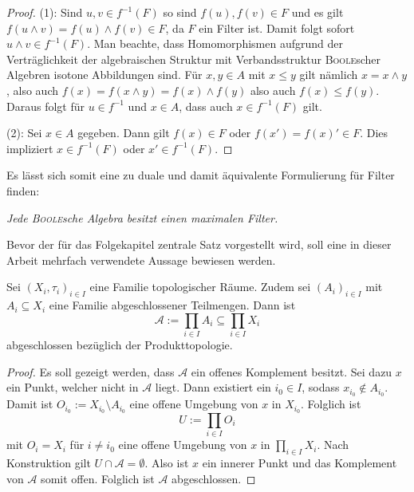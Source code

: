 \begin{proof}
  (1):
  Sind $u,v \in f^{-1}(F)$ so sind $f(u),f(v) \in F$ und es gilt $f(u \land v) = f(u) \land f(v) \in F$, da $F$ ein Filter ist.
  Damit folgt sofort $u \land v \in f^{-1}(F)$.
  Man beachte, dass Homomorphismen aufgrund der Verträglichkeit der algebraischen Struktur mit Verbandsstruktur \textsc{Boole}scher Algebren isotone Abbildungen sind.
  Für $x,y \in A$ mit $x \leq y$ gilt nämlich $x = x \land y$, also auch $f(x) = f(x\land y) = f(x) \land f(y)$ also auch $f(x) \leq f(y)$.
  Daraus folgt für $u \in f^{-1}$ und $x \in A$, dass auch $x \in f^{-1}(F)$ gilt.

  (2):
  Sei $x \in A$ gegeben.
  Dann gilt $f(x) \in F$ oder $f(x') = f(x)' \in F$.
  Dies impliziert $x \in f^{-1}(F)$ oder $x' \in f^{-1}(F)$.
\end{proof}



Es lässt sich somit eine zu \PIT duale und damit äquivalente Formulierung für Filter finden:
  \begin{addmargin}[2em]{2em}%
    \textit{Jede \textsc{Boole}sche Algebra besitzt einen maximalen Filter.}
  \end{addmargin}


Bevor der für das Folgekapitel zentrale Satz vorgestellt wird, soll eine in dieser Arbeit mehrfach verwendete Aussage bewiesen werden.

\begin{prop}
  \label{prop:cartesianclosed}
  Sei $(X_i,\tau_i)_{i \in I}$ eine Familie topologischer Räume. 
  Zudem sei $(A_i)_{i \in I}$ mit  $A_i \subseteq X_i$ eine Familie abgeschlossener Teilmengen.
  Dann ist 
  \begin{displaymath}
    \mathcal{A} := \prod_{i \in I} A_i \subseteq \prod_{i \in I} X_i
  \end{displaymath}
  abgeschlossen bezüglich der Produkttopologie.
\end{prop}

\begin{proof}
  Es soll gezeigt werden, dass $\mathcal{A}$ ein offenes Komplement besitzt.
  Sei dazu $x$ ein Punkt, welcher nicht in $\mathcal{A}$ liegt.
  Dann existiert ein $i_0 \in I$, sodass $x_{i_0} \not\in A_{i_0}$.
  Damit ist $O_{i_0} := X_{i_0} \setminus A_{i_0}$ eine offene Umgebung von $x$ in $X_{i_0}$.
  Folglich ist
  \begin{displaymath}
    U:= \prod_{i \in I} O_i
  \end{displaymath}
  mit $O_i = X_i$ für $i \not= i_0$ eine offene Umgebung von $x$ in $\prod_{i \in I} X_i$.
  Nach Konstruktion gilt $U \cap \mathcal{A} = \emptyset$.
  Also ist $x$ ein innerer Punkt und das Komplement von $\mathcal{A}$ somit offen.
  Folglich ist $\mathcal{A}$ abgeschlossen.
\end{proof}

